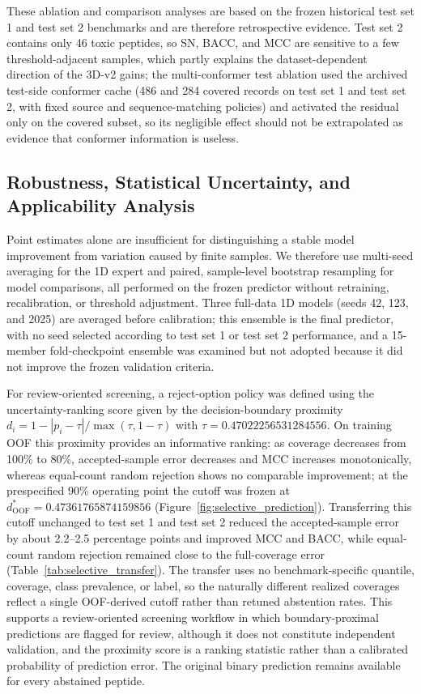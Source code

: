 \documentclass[12pt]{article}
\begin{document}
These ablation and comparison analyses are based on the frozen historical
test set 1 and test set 2 benchmarks and are therefore retrospective evidence. Test set 2
contains only 46 toxic peptides, so SN, BACC, and MCC are sensitive to a few
threshold-adjacent samples, which partly explains the dataset-dependent
direction of the 3D-v2 gains; the multi-conformer test ablation used the
archived test-side conformer cache (486 and 284 covered records on test set 1 and
test set 2, with fixed source and sequence-matching policies) and activated the
residual only on the covered subset, so its negligible effect should not be
extrapolated as evidence that conformer information is useless.
\subsection{Robustness, Statistical Uncertainty, and Applicability Analysis}
Point estimates alone are insufficient for distinguishing a stable model
improvement from variation caused by finite samples. We therefore use
multi-seed averaging for the 1D expert and paired, sample-level bootstrap
resampling for model comparisons, all performed on the frozen predictor
without retraining, recalibration, or threshold adjustment. Three full-data
1D models (seeds 42, 123, and 2025) are averaged before calibration; this
ensemble is the final predictor, with no seed selected according to test set 1 or
test set 2 performance, and a 15-member fold-checkpoint ensemble was examined but
not adopted because it did not improve the frozen validation criteria.

For review-oriented screening, a reject-option policy \cite{chow1970reject}
was defined using the uncertainty-ranking score given by the decision-boundary
proximity $d_i = 1 - |p_i - \tau|/\max(\tau, 1-\tau)$ with
$\tau = 0.47022256531284556$. On training OOF this proximity provides an
informative ranking: as coverage decreases from 100\% to 80\%, accepted-sample
error decreases and MCC increases monotonically, whereas equal-count random
rejection shows no comparable improvement; at the prespecified 90\% operating
point the cutoff was frozen at $d_{\mathrm{OOF}}^{*} = 0.47361765874159856$
(Figure~\ref{fig:selective_prediction}). Transferring this cutoff unchanged
to test set 1 and test set 2 reduced the accepted-sample error by about 2.2--2.5
percentage points and improved MCC and BACC, while equal-count random
rejection remained close to the full-coverage error
(Table~\ref{tab:selective_transfer}).
The transfer uses no benchmark-specific quantile, coverage, class prevalence,
or label, so the naturally different realized coverages reflect a single
OOF-derived cutoff rather than retuned abstention rates. This supports a
review-oriented screening workflow in which boundary-proximal predictions are
flagged for review, although it does not constitute independent validation,
and the proximity score is a ranking statistic rather than a calibrated
probability of prediction error. The original binary prediction remains
available for every abstained peptide.
\end{document}
